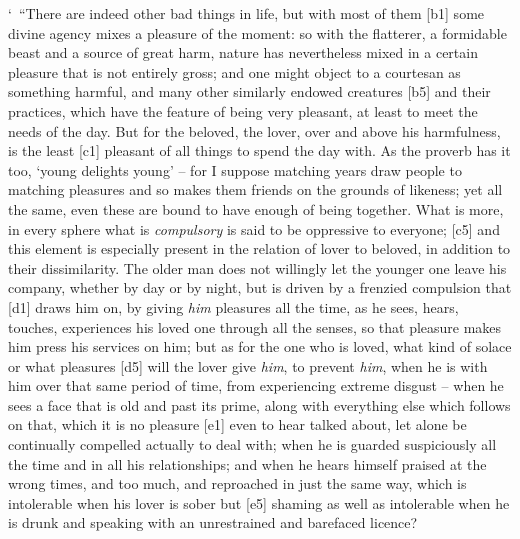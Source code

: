 ‘~“There are indeed other bad things in life, but with most of them
{[}b1{]} some divine agency mixes a pleasure of the moment: so with the
flatterer, a formidable beast and a source of great harm, nature has
nevertheless mixed in a certain pleasure that is not entirely gross; and
one might object to a courtesan as something harmful, and many other
similarly endowed creatures {[}b5{]} and their practices, which have the
feature of being very pleasant, at least to meet the needs of the day.
But for the beloved, the lover, over and above his harmfulness, is the
least {[}c1{]} pleasant of all things to spend the day with. As the
proverb has it too, ‘young delights young' -- for I suppose matching
years draw people to matching pleasures and so makes them friends on the
grounds of likeness; yet all the same, even these are bound to have
enough of being together. What is more, in every sphere what is
{\em compulsory} is said to be oppressive to everyone; {[}c5{]} and this
element is especially present in the relation of lover to beloved, in
addition to their dissimilarity. The older man does not willingly let
the younger one leave his company, whether by day or by night, but is
driven by a frenzied compulsion that {[}d1{]} draws him on, by giving
{\em him} pleasures all the time, as he sees, hears, touches,
experiences his loved one through all the senses, so that pleasure makes
him press his services on him; but as for the one who is loved, what
kind of solace or what pleasures {[}d5{]} will the lover give {\em him},
to prevent {\em him}, when he is with him over that same period of time,
from experiencing extreme disgust -- when he sees a face that is old and
past its prime, along with everything else which follows on that, which
it is no pleasure {[}e1{]} even to hear talked about, let alone be
continually compelled actually to deal with; when he is guarded
suspiciously all the time and in all his relationships; and when he
hears himself praised at the wrong times, and too much, and reproached
in just the same way, which is intolerable when his lover is sober but
{[}e5{]} shaming as well as intolerable when he is drunk and speaking
with an unrestrained and barefaced licence?

